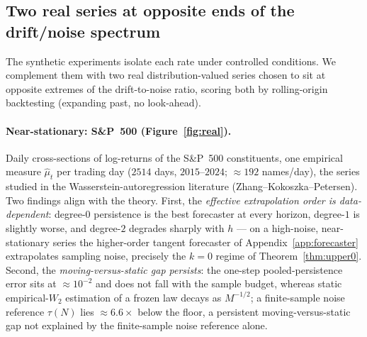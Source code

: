 \documentclass[11pt]{article}
\theoremstyle{definition}
\theoremstyle{remark}
\begin{document}
\subsection{Two real series at opposite ends of the drift/noise spectrum}\label{sec:realdata}
The synthetic experiments isolate each rate under controlled conditions. We complement them with two
real distribution-valued series chosen to sit at opposite extremes of the drift-to-noise ratio,
scoring both by rolling-origin backtesting (expanding past, no look-ahead).

\paragraph{Near-stationary: S\&P~500 (Figure~\ref{fig:real}).} Daily cross-sections of log-returns of
the S\&P~500 constituents, one empirical measure $\hat\mu_t$ per trading day ($2514$ days,
$2015$--$2024$; $\approx192$ names/day), the series studied in the Wasserstein-autoregression
literature (Zhang--Kokoszka--Petersen). Two findings align with the theory. First, the
\emph{effective extrapolation order is data-dependent}: degree-$0$ persistence is the best forecaster
at every horizon, degree-$1$ is slightly worse, and degree-$2$ degrades sharply with $h$ --- on a
high-noise, near-stationary series the higher-order tangent forecaster of
Appendix~\ref{app:forecaster} extrapolates sampling noise, precisely the $k{=}0$ regime of
Theorem~\ref{thm:upper0}. Second, the \emph{moving-versus-static gap persists}: the one-step
pooled-persistence error sits at $\approx10^{-2}$ and does not fall with the sample budget, whereas
static empirical-$W_2$ estimation of a frozen law decays as $M^{-1/2}$; a finite-sample noise
reference $\tau(N)$ lies $\approx6.6\times$ below the floor, a persistent moving-versus-static gap
not explained by the finite-sample noise reference alone.
\end{document}
